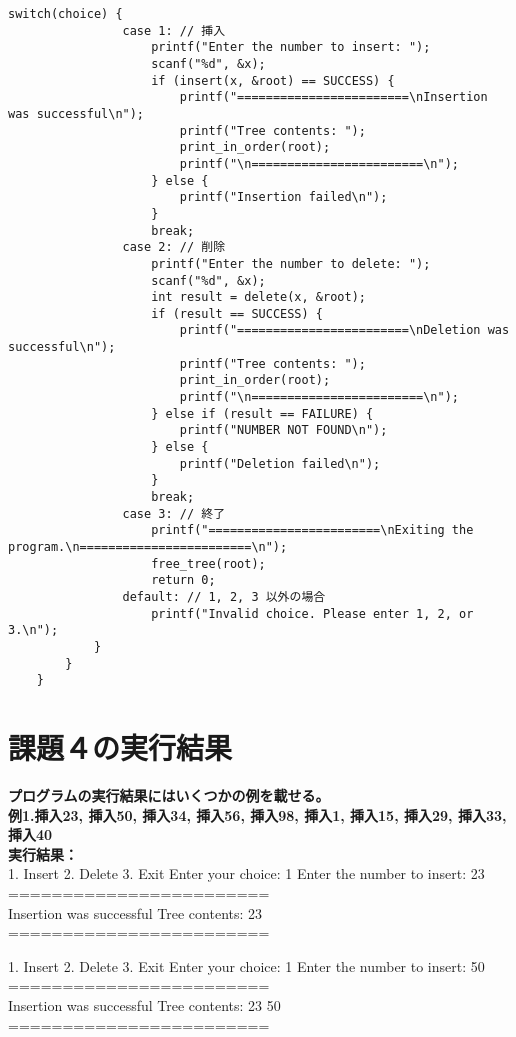 \documentclass[]{jsarticle}
\begin{document}
\begin{lstlisting}[caption={binarySearchTree.c}]
            switch(choice) {
                case 1: // 挿入
                    printf("Enter the number to insert: ");
                    scanf("%d", &x);
                    if (insert(x, &root) == SUCCESS) {
                        printf("========================\nInsertion was successful\n");
                        printf("Tree contents: ");
                        print_in_order(root);
                        printf("\n========================\n");
                    } else {
                        printf("Insertion failed\n");
                    }
                    break;
                case 2: // 削除
                    printf("Enter the number to delete: ");
                    scanf("%d", &x);
                    int result = delete(x, &root);
                    if (result == SUCCESS) {
                        printf("========================\nDeletion was successful\n");
                        printf("Tree contents: ");
                        print_in_order(root);
                        printf("\n========================\n");
                    } else if (result == FAILURE) {
                        printf("NUMBER NOT FOUND\n");
                    } else {
                        printf("Deletion failed\n");
                    }
                    break;
                case 3: // 終了
                    printf("========================\nExiting the program.\n========================\n");
                    free_tree(root);
                    return 0;
                default: // 1, 2, 3 以外の場合
                    printf("Invalid choice. Please enter 1, 2, or 3.\n");
            }
        }
    }
\end{lstlisting}

\section*{課題４の実行結果}
\noindent\textbf{プログラムの実行結果にはいくつかの例を載せる。}\\
\textbf{例1.挿入23, 挿入50, 挿入34, 挿入56, 挿入98, 挿入1, 挿入15, 挿入29, 挿入33, 挿入40}\\
\textbf{実行結果：}\\
1. Insert
2. Delete
3. Exit
Enter your choice: 1
Enter the number to insert: 23\\
========================\\
Insertion was successful
Tree contents: 23 \\
========================

1. Insert
2. Delete
3. Exit
Enter your choice: 1
Enter the number to insert: 50\\
========================\\
Insertion was successful
Tree contents: 23 50 \\
========================
\end{document}
